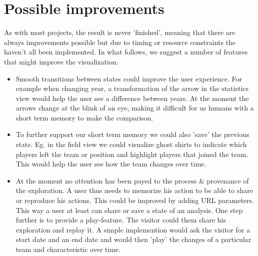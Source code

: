 \documentclass{sigchi}
\begin{document}
\section{Possible improvements}
As with most projects, the result is never 'finished', meaning that there are always improvements
possible but due to timing or resource constraints the haven't all been implemented. In what 
follows, we suggest a number of features that might improve the visualization:
\begin{itemize}
    \item Smooth transitions between states could improve the user experience. For example when changing
    year, a transformation of the arrow in the statistics view would help the user see a difference between years.
    At the moment the arrows change at the blink of an eye, making it difficult for us humans with a short term memory
    to make the comparison.
    \item To further support our short term memory we could also 'save' the previous state. Eg. in the field view we could
    visualize ghost shirts to indicate which players left the team or position and highlight players that joined the team. 
    This would help the user see how the team changes over time.
    \item At the moment no attention has been payed to the process & provenance of the exploration. A user thus needs to 
    memorize his action to be able to share or reproduce his actions. This could be improved by adding URL parameters. This
    way a user at least can share or save a state of an analysis. One step further is to provide a play-feature. The visitor could 
    them share his exploration and replay it. A simple implemention would ask the visitor for a start date and an end date and
    would then 'play' the changes of a particular team and characteristic over time.
\end{itemize}
\end{document}
